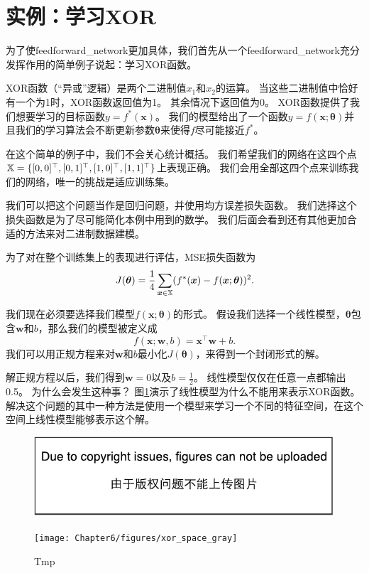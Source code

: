 \section{实例：学习XOR}
\label{sec:example_learning_xor}

为了使\gls{feedforward_network}更加具体，我们首先从一个\gls{feedforward_network}充分发挥作用的简单例子说起：学习XOR函数。

XOR函数（``异或''逻辑）是两个二进制值$x_1$和$x_2$的运算。
当这些二进制值中恰好有一个为1时，XOR函数返回值为1。
其余情况下返回值为0。
XOR函数提供了我们想要学习的目标函数$y = f^*(\bm{x})$。
我们的模型给出了一个函数$y=f(\bm{x}; \bm{\theta})$并且我们的学习算法会不断更新参数$\bm{\theta}$来使得$f$尽可能接近$f^*$。

在这个简单的例子中，我们不会关心统计概括。
我们希望我们的网络在这四个点$\mathbb{X} =\{[0, 0]^\top, [0, 1]^\top, [1, 0]^\top, [1, 1]^\top\}$上表现正确。
我们会用全部这四个点来训练我们的网络，唯一的挑战是适应训练集。

我们可以把这个问题当作是回归问题，并使用均方误差损失函数。
我们选择这个损失函数是为了尽可能简化本例中用到的数学。
我们后面会看到还有其他更加合适的方法来对二进制数据建模。


为了对在整个训练集上的表现进行评估，MSE损失函数为
\begin{equation}
J(\bm{\theta}) = \frac{1}{4} \sum_{\bm{x}\in \mathbb{X}} (f^*(\bm{x}) - f(\bm{x}; \bm{\theta}))^2.
\end{equation}

我们现在必须要选择我们模型$f(\bm{x}; \bm{\theta})$的形式。
假设我们选择一个线性模型，$\bm{\theta}$包含$\bm{w}$和$b$，那么我们的模型被定义成
\begin{equation}
f(\bm{x}; \bm{w}, b) = \bm{x}^\top \bm{w} + b.
\end{equation}
我们可以用正规方程来对$\bm{w}$和$b$最小化$J(\bm{\theta})$，来得到一个封闭形式的解。

解正规方程以后，我们得到$\bm{w} = 0$以及$b = \frac{1}{2}$。
线性模型仅仅在任意一点都输出0.5。
为什么会发生这种事？
图\ref{fig:chap6_xor_space_gray}演示了线性模型为什么不能用来表示XOR函数。
解决这个问题的其中一种方法是使用一个模型来学习一个不同的特征空间，在这个空间上线性模型能够表示这个解。
\begin{figure}[!htb]
\ifOpenSource
\centerline{\includegraphics{figure.pdf}}
\else
\centerline{\texttt{[image: Chapter6/figures/xor\_space\_gray]}}
\fi
\caption{Tmp}
\label{fig:chap6_xor_space_gray}
\end{figure}


